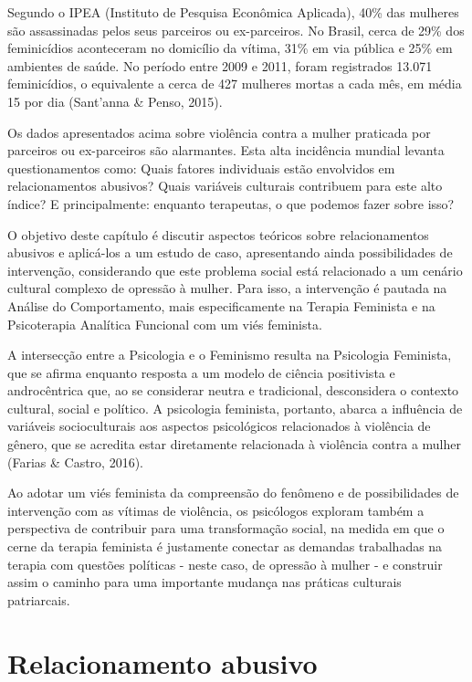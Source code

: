 Segundo o IPEA (Instituto de Pesquisa Econômica Aplicada), 40\% das mulheres são assassinadas pelos seus parceiros ou ex-parceiros. No Brasil, cerca de 29\% dos feminicídios aconteceram no domicílio da vítima, 31\% em via pública e 25\% em ambientes de saúde. No período entre 2009 e 2011, foram registrados 13.071 feminicídios, o equivalente a cerca de 427 mulheres mortas a cada mês, em média 15 por dia (Sant'anna \& Penso, 2015).

Os dados apresentados acima sobre violência contra a mulher praticada por parceiros ou ex-parceiros são alarmantes. Esta alta incidência mundial levanta questionamentos como: Quais fatores individuais estão envolvidos em relacionamentos abusivos? Quais variáveis culturais contribuem para este alto índice? E principalmente: enquanto terapeutas, o que podemos fazer sobre isso?

O objetivo deste capítulo é discutir aspectos teóricos sobre relacionamentos abusivos e aplicá-los a um estudo de caso, apresentando ainda possibilidades de intervenção, considerando que este problema social está relacionado a um cenário cultural complexo de opressão à mulher. Para isso, a intervenção é pautada na Análise do Comportamento, mais especificamente na Terapia Feminista e na Psicoterapia Analítica Funcional com um viés feminista.

A intersecção entre a Psicologia e o Feminismo resulta na Psicologia Feminista, que se afirma enquanto resposta a um modelo de ciência positivista e androcêntrica que, ao se considerar neutra e tradicional, desconsidera o contexto cultural, social e político. A psicologia feminista, portanto, abarca a influência de variáveis socioculturais aos aspectos psicológicos relacionados à violência de gênero, que se acredita estar diretamente relacionada à violência contra a mulher (Farias \& Castro, 2016). 

Ao adotar um viés feminista da compreensão do fenômeno e de possibilidades de intervenção com as vítimas de violência, os psicólogos exploram também a perspectiva de contribuir para uma transformação social, na medida em que o cerne da terapia feminista é justamente conectar as demandas trabalhadas na terapia com questões políticas - neste caso, de opressão à mulher - e construir assim o caminho para uma importante mudança nas práticas culturais patriarcais.

\section*{Relacionamento abusivo}

